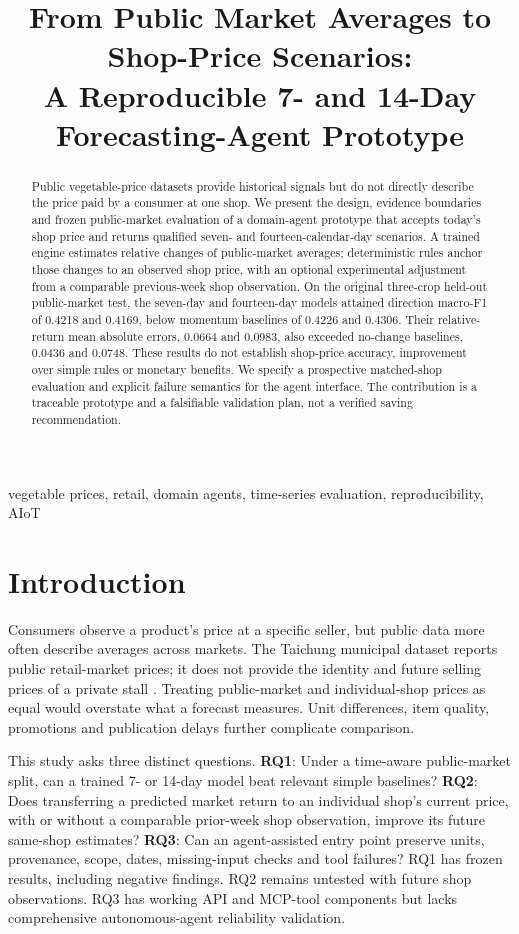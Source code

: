 \documentclass[conference]{IEEEtran}
\title{From Public Market Averages to Shop-Price Scenarios:\\ A Reproducible 7- and 14-Day Forecasting-Agent Prototype}
\author{\IEEEauthorblockN{Fresh Market Price Forecast Agent (FMPA) Project Team}
\IEEEauthorblockA{AIoT and Data Analytics Course Project\\DIC4 working manuscript --- 25 November 2026}}
\begin{document}
\maketitle
\begin{abstract}
Public vegetable-price datasets provide historical signals but do not directly describe the price paid by a consumer at one shop. We present the design, evidence boundaries and frozen public-market evaluation of a domain-agent prototype that accepts today's shop price and returns qualified seven- and fourteen-calendar-day scenarios. A trained engine estimates relative changes of public-market averages; deterministic rules anchor those changes to an observed shop price, with an optional experimental adjustment from a comparable previous-week shop observation. On the original three-crop held-out public-market test, the seven-day and fourteen-day models attained direction macro-F1 of 0.4218 and 0.4169, below momentum baselines of 0.4226 and 0.4306. Their relative-return mean absolute errors, 0.0664 and 0.0983, also exceeded no-change baselines, 0.0436 and 0.0748. These results do not establish shop-price accuracy, improvement over simple rules or monetary benefits. We specify a prospective matched-shop evaluation and explicit failure semantics for the agent interface. The contribution is a traceable prototype and a falsifiable validation plan, not a verified saving recommendation.
\end{abstract}
\begin{IEEEkeywords}
vegetable prices, retail, domain agents, time-series evaluation, reproducibility, AIoT
\end{IEEEkeywords}

\section{Introduction}
Consumers observe a product's price at a specific seller, but public data more often describe averages across markets. The Taichung municipal dataset reports public retail-market prices; it does not provide the identity and future selling prices of a private stall \cite{taichung84539}. Treating public-market and individual-shop prices as equal would overstate what a forecast measures. Unit differences, item quality, promotions and publication delays further complicate comparison.

This study asks three distinct questions. \textbf{RQ1}: Under a time-aware public-market split, can a trained 7- or 14-day model beat relevant simple baselines? \textbf{RQ2}: Does transferring a predicted market return to an individual shop's current price, with or without a comparable prior-week shop observation, improve its future same-shop estimates? \textbf{RQ3}: Can an agent-assisted entry point preserve units, provenance, scope, dates, missing-input checks and tool failures? RQ1 has frozen results, including negative findings. RQ2 remains untested with future shop observations. RQ3 has working API and MCP-tool components but lacks comprehensive autonomous-agent reliability validation.
\end{document}
